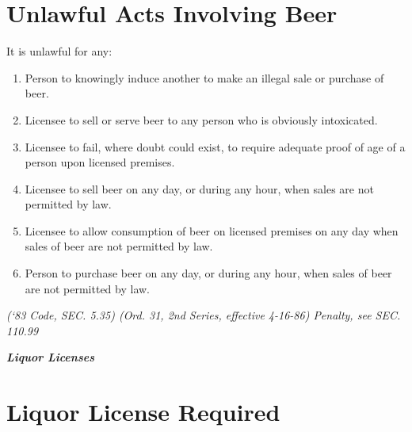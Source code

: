 \section{Unlawful Acts Involving Beer}
It is unlawful for any:
\begin{enumerate}[{\indent}A)]
    \item Person to knowingly induce another to make an illegal sale or purchase of beer.
    \item Licensee to sell or serve beer to any person who is obviously intoxicated.
    \item Licensee to fail, where doubt could exist, to require adequate proof of age of a person upon licensed premises.
    \item Licensee to sell beer on any day, or during any hour, when sales are not permitted by law.
    \item Licensee to allow consumption of beer on licensed premises on any day when sales of beer are not permitted by law.
    \item Person to purchase beer on any day, or during any hour, when sales of beer are not permitted by law.
\end{enumerate}
\emph{(‘83 Code, SEC. 5.35)  (Ord. 31, 2nd Series, effective 4-16-86)  Penalty, see SEC. 110.99}

\begin{center}
    \emph{\textbf{\LARGE{Liquor Licenses}}}
\end{center}

\setcounter{section}{79}
\section{Liquor License Required}
